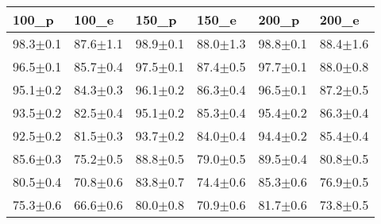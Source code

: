 \begin{tabular}{llllll}
\toprule
       100_p &        100_e &        150_p &        150_e &        200_p &        200_e \\
\midrule
98.3$\pm$0.1 & 87.6$\pm$1.1 & 98.9$\pm$0.1 & 88.0$\pm$1.3 & 98.8$\pm$0.1 & 88.4$\pm$1.6 \\
96.5$\pm$0.1 & 85.7$\pm$0.4 & 97.5$\pm$0.1 & 87.4$\pm$0.5 & 97.7$\pm$0.1 & 88.0$\pm$0.8 \\
95.1$\pm$0.2 & 84.3$\pm$0.3 & 96.1$\pm$0.2 & 86.3$\pm$0.4 & 96.5$\pm$0.1 & 87.2$\pm$0.5 \\
93.5$\pm$0.2 & 82.5$\pm$0.4 & 95.1$\pm$0.2 & 85.3$\pm$0.4 & 95.4$\pm$0.2 & 86.3$\pm$0.4 \\
92.5$\pm$0.2 & 81.5$\pm$0.3 & 93.7$\pm$0.2 & 84.0$\pm$0.4 & 94.4$\pm$0.2 & 85.4$\pm$0.4 \\
85.6$\pm$0.3 & 75.2$\pm$0.5 & 88.8$\pm$0.5 & 79.0$\pm$0.5 & 89.5$\pm$0.4 & 80.8$\pm$0.5 \\
80.5$\pm$0.4 & 70.8$\pm$0.6 & 83.8$\pm$0.7 & 74.4$\pm$0.6 & 85.3$\pm$0.6 & 76.9$\pm$0.5 \\
75.3$\pm$0.6 & 66.6$\pm$0.6 & 80.0$\pm$0.8 & 70.9$\pm$0.6 & 81.7$\pm$0.6 & 73.8$\pm$0.5 \\
\bottomrule
\end{tabular}
